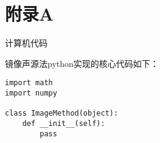 
\setcounter{secnumdepth}{-2}
\chapter{附\quad 录\quad A}
\begin{center}
\large
计算机代码
\vspace{0.5cm}
\end{center}

镜像声源法python实现的核心代码如下：
\begin{verbatim}
import math
import numpy

class ImageMethod(object):
	def __init__(self):
		pass

\end{verbatim}
